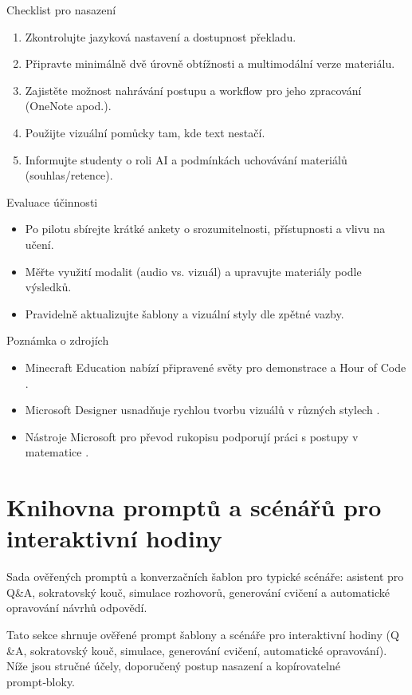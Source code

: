 \documentclass{report}%
\begin{document}
Checklist pro nasazení
\begin{enumerate}
  \item Zkontrolujte jazyková nastavení a dostupnost překladu.
  \item Připravte minimálně dvě úrovně obtížnosti a multimodální verze materiálu.
  \item Zajistěte možnost nahrávání postupu a workflow pro jeho zpracování (OneNote apod.).
  \item Použijte vizuální pomůcky tam, kde text nestačí.
  \item Informujte studenty o roli AI a podmínkách uchovávání materiálů (souhlas/retence).
\end{enumerate}

Evaluace účinnosti
\begin{itemize}
  \item Po pilotu sbírejte krátké ankety o srozumitelnosti, přístupnosti a vlivu na učení.
  \item Měřte využití modalit (audio vs. vizuál) a upravujte materiály podle výsledků.
  \item Pravidelně aktualizujte šablony a vizuální styly dle zpětné vazby.
\end{itemize}

Poznámka o zdrojích
\begin{itemize}
  \item Minecraft Education nabízí připravené světy pro demonstrace a Hour of Code \cite{kb_ai_101_tipu_pdf_04e4a115_page_15_2}.
  \item Microsoft Designer usnadňuje rychlou tvorbu vizuálů v různých stylech \cite{kb_ai_101_tipu_pdf_04e4a115_page_51_1}.
  \item Nástroje Microsoft pro převod rukopisu podporují práci s postupy v matematice \cite{kb_ai_101_tipu_pdf_04e4a115_page_8_1}.
\end{itemize}%

%
\section{Knihovna promptů a scénářů pro interaktivní hodiny}%
Sada ověřených promptů a konverzačních šablon pro typické scénáře: asistent pro Q\&A, sokratovský kouč, simulace rozhovorů, generování cvičení a automatické opravování návrhů odpovědí.%


%
Tato sekce shrnuje ověřené prompt šablony a scénáře pro interaktivní hodiny (Q\\ \&A, sokratovský kouč, simulace, generování cvičení, automatické opravování). Níže jsou stručné účely, doporučený postup nasazení a kopírovatelné prompt‑bloky.
\end{document}
